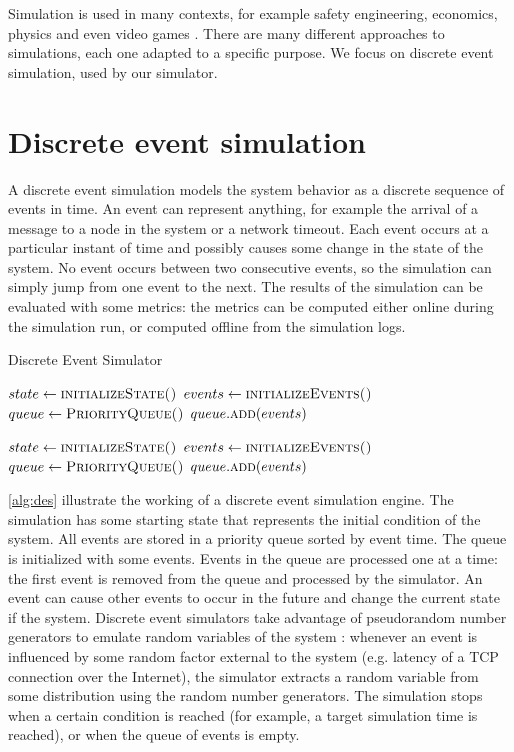\medskip
Simulation is used in many contexts, for example safety engineering, economics, physics and even video games \cite{wikipedia_simulation}.
There are many different approaches to simulations, each one adapted to a specific purpose.
We focus on discrete event simulation, used by our simulator.


\section{Discrete event simulation}
A discrete event simulation models the system behavior as a discrete sequence of events in time.
An event can represent anything, for example the arrival of a message to a node in the system or a network timeout.
Each event occurs at a particular instant of time and possibly causes some change in the state of the system.
No event occurs between two consecutive events, so the simulation can simply jump from one event to the next.
The results of the simulation can be evaluated with some metrics:
the metrics can be computed either online during the simulation run, or computed offline from the simulation logs.

\medskip
\begin{algorithm}
	\caption{Discrete Event Simulator}
	\label{alg:des}
	\begin{algorithmic}
		\State $state \leftarrow \Call{initializeState()}{}$
		\State $events \leftarrow \Call{initializeEvents()}{}$
		\State $queue \leftarrow \Call{PriorityQueue()}{}$
		\State $queue.\Call{add}{events}$


		\State $state \leftarrow \Call{initializeState()}{}$
		\State $events \leftarrow \Call{initializeEvents()}{}$
		\State $queue \leftarrow \Call{PriorityQueue()}{}$
		\State $queue.\Call{add}{events}$
	\end{algorithmic}
\end{algorithm}
\smallskip

\cref{alg:des} illustrate the working of a discrete event simulation engine.
The simulation has some starting state that represents the initial condition of the system.
All events are stored in a priority queue sorted by event time.
The queue is initialized with some events.
Events in the queue are processed one at a time:
the first event is removed from the queue and processed by the simulator.
An event can cause other events to occur in the future and change the current state if the system.
Discrete event simulators take advantage of pseudorandom number generators to emulate random variables of the system \cite{wikipedia_des}:
whenever an event is influenced by some random factor external to the system (e.g. latency of a TCP connection over the Internet), the simulator extracts a random variable from some distribution using the random number generators.
The simulation stops when a certain condition is reached (for example, a target simulation time is reached), or when the queue of events is empty.


